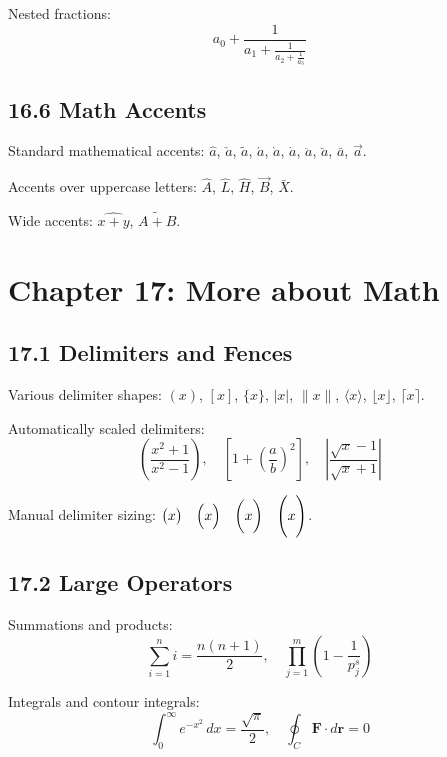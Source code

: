 \documentclass{article}
\begin{document}
Nested fractions:
\begin{equation}
a_0 + \frac{1}{a_1 + \frac{1}{a_2 + \frac{1}{a_3}}}
\end{equation}

\subsection*{16.6 Math Accents}
Standard mathematical accents:
$\hat{a}$, $\check{a}$, $\tilde{a}$, $\acute{a}$, $\grave{a}$, $\dot{a}$, $\ddot{a}$, $\breve{a}$, $\bar{a}$, $\vec{a}$.

Accents over uppercase letters:
$\hat{A}$, $\hat{L}$, $\hat{H}$, $\vec{B}$, $\bar{X}$.

Wide accents:
$\widehat{x+y}$, $\widetilde{A+B}$.

\section*{Chapter 17: More about Math}

\subsection*{17.1 Delimiters and Fences}
Various delimiter shapes:
$(x)$, $[x]$, $\{x\}$, $|x|$, $\|x\|$, $\langle x \rangle$, $\lfloor x \rfloor$, $\lceil x \rceil$.

Automatically scaled delimiters:
\begin{equation}
\left( \frac{x^2 + 1}{x^2 - 1} \right), \quad
\left[ 1 + \left( \frac{a}{b} \right)^2 \right], \quad
\left| \frac{\sqrt{x} - 1}{\sqrt{x} + 1} \right|
\end{equation}

Manual delimiter sizing:
$\bigl( x \bigr) \quad \Bigl( x \Bigr) \quad \biggl( x \biggr) \quad \Biggl( x \Biggr)$.

\subsection*{17.2 Large Operators}
Summations and products:
\begin{equation}
\sum_{i=1}^n i = \frac{n(n+1)}{2}, \quad \prod_{j=1}^m \left( 1 - \frac{1}{p_j^s} \right)
\end{equation}

Integrals and contour integrals:
\begin{equation}
\int_0^\infty e^{-x^2} \, dx = \frac{\sqrt{\pi}}{2}, \quad \oint_C \mathbf{F} \cdot d\mathbf{r} = 0
\end{equation}
\end{document}
